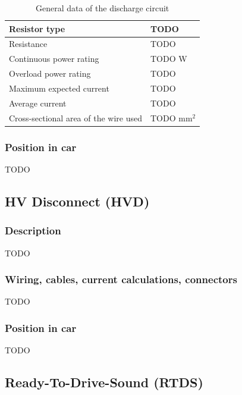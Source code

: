 \documentclass{article}
\begin{document}
	\begin{table}[H]
		\centering
		\begin{tabular}{|l|l|}
		\hline
		Resistor type & TODO \\ \hline
		Resistance & TODO \ohm \\ \hline
		Continuous power rating & TODO W \\ \hline
		Overload power rating & TODO \\ \hline
		Maximum expected current & TODO \\ \hline
		Average current & TODO\\ \hline
		Cross-sectional area of the wire used & TODO mm$^2$ \\ \hline
		\end{tabular}
		\caption{General data of the discharge circuit}
		\label{dctable}
	\end{table}

\subsubsection{Position in car}
TODO

\subsection{HV Disconnect (HVD)}
\subsubsection{Description}
TODO

\subsubsection{Wiring, cables, current calculations, connectors}
TODO

\subsubsection{Position in car}
TODO

\subsection{Ready-To-Drive-Sound (RTDS)}
\end{document}
